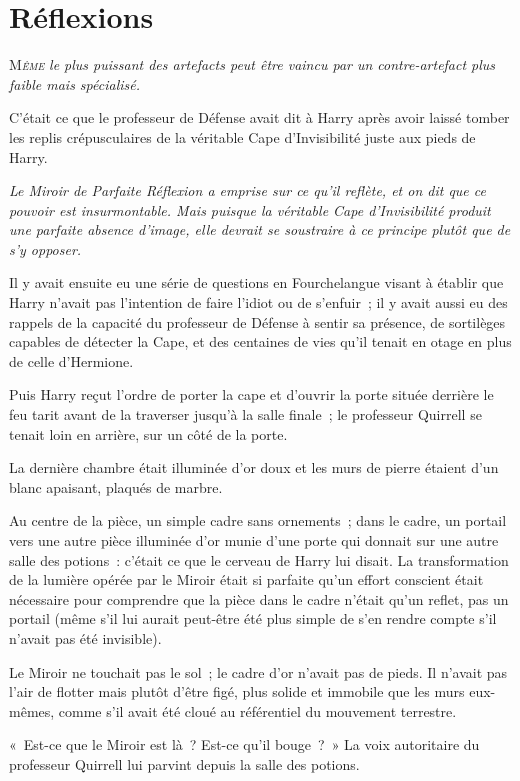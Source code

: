 \chapter{Réflexions}

\lettrine{M}{\emph{ême}} \emph{le plus puissant des artefacts peut être vaincu par un contre-artefact plus faible mais spécialisé.}

C'était ce que le professeur de Défense avait dit à Harry après avoir laissé tomber les replis crépusculaires de la véritable Cape d'Invisibilité juste aux pieds de Harry.

\emph{Le Miroir de Parfaite Réflexion a emprise sur ce qu'il reflète, et on dit que ce pouvoir est insurmontable. Mais puisque la véritable Cape d'Invisibilité produit une parfaite absence d'image, elle devrait se soustraire à ce principe plutôt que de s'y opposer.}

Il y avait ensuite eu une série de questions en Fourchelangue visant à établir que Harry n'avait pas l'intention de faire l'idiot ou de s'enfuir~; il y avait aussi eu des rappels de la capacité du professeur de Défense à sentir sa présence, de sortilèges capables de détecter la Cape, et des centaines de vies qu'il tenait en otage en plus de celle d'Hermione.

Puis Harry reçut l'ordre de porter la cape et d'ouvrir la porte située derrière le feu tarit avant de la traverser jusqu'à la salle finale~; le professeur Quirrell se tenait loin en arrière, sur un côté de la porte.

La dernière chambre était illuminée d'or doux et les murs de pierre étaient d'un blanc apaisant, plaqués de marbre.

Au centre de la pièce, un simple cadre sans ornements~; dans le cadre, un portail vers une autre pièce illuminée d'or munie d'une porte qui donnait sur une autre salle des potions~: c'était ce que le cerveau de Harry lui disait. La transformation de la lumière opérée par le Miroir était si parfaite qu'un effort conscient était nécessaire pour comprendre que la pièce dans le cadre n'était qu'un reflet, pas un portail (même s'il lui aurait peut-être été plus simple de s'en rendre compte s'il n'avait pas été invisible).

Le Miroir ne touchait pas le sol~; le cadre d'or n'avait pas de pieds. Il n'avait pas l'air de flotter mais plutôt d'être figé, plus solide et immobile que les murs eux-mêmes, comme s'il avait été cloué au référentiel du mouvement terrestre.

«~Est-ce que le Miroir est là~? Est-ce qu'il bouge~?~» La voix autoritaire du professeur Quirrell lui parvint depuis la salle des potions.

